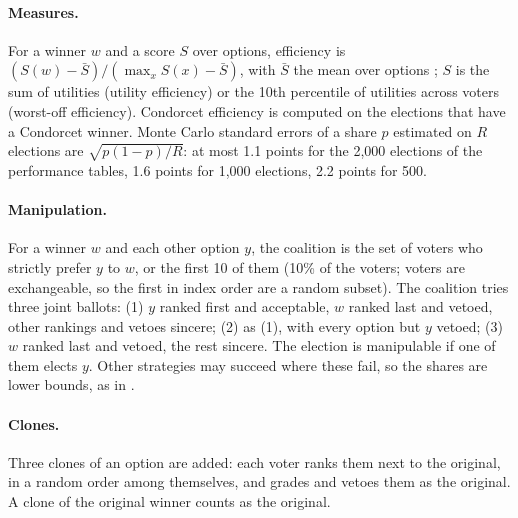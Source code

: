 \paragraph{Measures.} For a winner $w$ and a score $S$ over options, efficiency is
$(S(w) - \bar S)/(\max_x S(x) - \bar S)$, with $\bar S$ the mean over options \citep{Merrill1984}; $S$
is the sum of utilities (utility efficiency) or the 10th percentile of utilities across voters (worst-off
efficiency). Condorcet efficiency is computed on the elections that have a Condorcet winner. Monte Carlo
standard errors of a share $p$ estimated on $R$ elections are $\sqrt{p(1-p)/R}$: at most 1.1 points for
the 2,000 elections of the performance tables, 1.6 points for 1,000 elections, 2.2 points for 500.

\paragraph{Manipulation.} For a winner $w$ and each other option $y$, the coalition is the set of voters
who strictly prefer $y$ to $w$, or the first 10 of them (10\% of the voters; voters are exchangeable, so
the first in index order are a random subset). The coalition tries three joint ballots: (1) $y$ ranked
first and acceptable, $w$ ranked last and vetoed, other rankings and vetoes sincere; (2) as (1), with
every option but $y$ vetoed; (3) $w$ ranked last and vetoed, the rest sincere. The election is
manipulable if one of them elects $y$. Other strategies may succeed where these fail, so the shares are
lower bounds, as in \citet{GreenArmytageTidemanCosman2016}.

\paragraph{Clones.} Three clones of an option are added: each voter ranks them next to the original, in a
random order among themselves, and grades and vetoes them as the original. A clone of the original winner
counts as the original.

